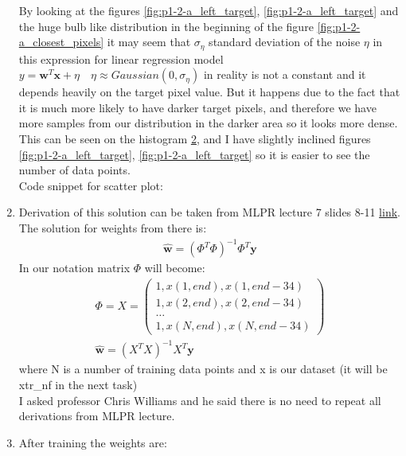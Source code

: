 \documentclass{article}
\newcommand{\vect}[1]{\boldsymbol{#1}} %
\begin{document}
\begin{enumerate}[label=(\alph*)]
\begin{figure}[htbp]
\begin{subfigure}{0.5\textwidth}
				 			\label{fig:p1-2-a_target_hist}
				 		\end{subfigure} 		
				 	\end{figure}	
					By looking at the figures \ref{fig:p1-2-a_left_target}, \ref{fig:p1-2-a_left_target} and the huge bulb like distribution in the beginning of the figure  \ref{fig:p1-2-a_closest_pixels}  it may seem that $\sigma_{\eta}$ standard deviation of the noise $\eta$ in this expression for linear regression model $y = \vect{w}^{T}\vect{x} + \eta \quad \eta \approx Gaussian(0, \sigma_{\eta})$ in reality is not a constant and it depends heavily on the target pixel value. But it happens due to the fact that it is much more likely to have darker target pixels, and therefore we have more samples from our distribution in the darker area so it looks more dense. This can be seen on the histogram \ref{fig:p1-2-a_target_hist}, and I have slightly inclined figures  \ref{fig:p1-2-a_left_target}, \ref{fig:p1-2-a_left_target} so it is easier to see the number of data points.\\
					Code snippet for scatter plot:
					 
				\item
					Derivation of this solution can be taken from MLPR lecture 7 slides 8-11 \href{http://www.inf.ed.ac.uk/teaching/courses/mlpr/2015/slides/07_regression.pdf}{link}. The solution for weights from there is:
					\begin{gather*}
					\hat{\vect{w}} = (\Phi^T \Phi)^{-1} \Phi^T \vect{y}
					\end{gather*}
					In our notation matrix $\Phi$ will become:
					\begin{gather*}
						\Phi = X = 
						\begin{pmatrix}
						1, x(1, end), x(1, end - 34)\\
						1, x(2, end), x(2, end - 34)\\
						\ldots \\
						1, x(N, end), x(N, end -34)
						\end{pmatrix} \\
						\hat{\vect{w}} = (X^T X)^{-1} X^T \vect{y}
					\end{gather*}
					where N is a number of training data points and x is our dataset (it will be xtr\_nf in the next task)\\
					I asked professor Chris Williams and he said there is no need to repeat all derivations from MLPR lecture.
				\item
					After training the weights are:
					\begin{center}

\end{center}
\end{enumerate}
\end{document}
